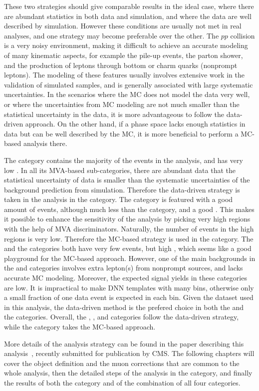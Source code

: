 These two strategies should give comparable results in the ideal case, where there are abundant statistics in both data and simulation,
and where the data are well described by simulation.
However these conditions are usually not met in real analyses, and one strategy may become preferable over the other.
The $pp$ collision is a very noisy environment, making it difficult to achieve an accurate modeling of many kinematic aspects,
for example the pile-up events, the parton shower, and the production of leptons through bottom or charm quarks (nonprompt leptons).
The modeling of these features usually involves extensive work in the validation of simulated samples, and is generally associated with large systematic uncertainties.
In the scenarios where the MC does not model the data very well, or where the uncertainties from MC modeling are not much smaller than the statistical uncertainty in the data,
it is more advantageous to follow the data-driven approach.
On the other hand, if a phase space lacks enough statistics in data but can be well described by the MC, 
it is more beneficial to perform a MC-based analysis there.

The \ggH category contains the majority of the events in the \hmm analysis, and has very low \SoB. 
In all its MVA-based sub-categories, there are abundant data that the statistical uncertainty of data is smaller than the systematic uncertainties of the background prediction from simulation.
Therefore the data-driven strategy is taken in the analysis in the \ggH category.
The \qqH category is featured with a good amount of events, although much less than the \ggH category, and a good \SoB.
This makes it possible to enhance the sensitivity of the analysis by picking very high \SoB regions with the help of MVA discriminators. 
Naturally, the number of events in the high \SoB regions is very low. Therefore the MC-based strategy is used in the \qqH category.
The \VH and the \ttH categories both have very few events, but high \SoB, which seems like a good playground for the MC-based approach.
However, one of the main backgrounds in the \VH and \ttH categories involves extra lepton(s) from nonprompt sources, and lacks accurate MC modeling.
Moreover, the expected signal yields in these categories are low. 
It is impractical to make DNN templates with many bins, 
otherwise only a small fraction of one data event is expected in each bin.
Given the dataset used in this analysis, the data-driven method is the prefered choice in both the \VH and the \ttH categories.
Overall, the \ggH, \VH, and \ttH categories follow the data-driven strategy, while the \qqH category takes the MC-based approach.

More details of the analysis strategy can be found in the paper describing this analysis~\cite{cmscollaboration2020evidence}, recently submitted for publication by CMS. 
The following chapters will cover the object definition and the muon corrections that are common to the whole analysis, 
then the detailed steps of the analysis in the \VH category, 
and finally the results of both the \VH category and of the combination of all four categories.
